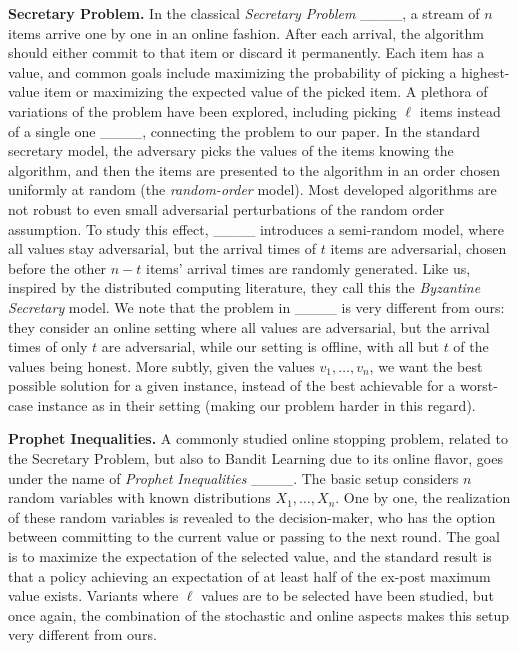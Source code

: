 \noindent \textbf{Secretary Problem.} In the classical \emph{Secretary Problem} ____, a stream of $n$ items arrive one by one in an online fashion. After each arrival, the algorithm should either commit to that item or discard it permanently. Each item has a value, and common goals include maximizing the probability of picking a highest-value item or maximizing the expected value of the picked item. A plethora of variations of the problem have been explored, including picking $\ell$ items instead of a single one ____, connecting the problem to our paper. In the standard secretary model, the adversary picks the values of the items knowing the algorithm, and then the items are presented to the algorithm in an order chosen uniformly at random (the \emph{random-order} model). Most developed algorithms are not robust to even small adversarial perturbations of the random order assumption. To study this effect, ____ introduces a semi-random model, where all values stay adversarial, but the arrival times of $t$ items are adversarial, chosen before the other $n - t$ items' arrival times are randomly generated. Like us, inspired by the distributed computing literature, they call this the \emph{Byzantine Secretary} model. We note that the problem in ____ is very different from ours: they consider an online setting where all values are adversarial, but the arrival times of only $t$ are adversarial, while our setting is offline, with all but $t$ of the values being honest. More subtly, given the values $v_1, \dots, v_n$, we want 
the best possible solution for a given instance, instead of the best achievable for a worst-case instance as in their setting (making our problem harder in this regard).

\noindent \textbf{Prophet Inequalities.} A commonly studied online stopping problem, related to the Secretary Problem, but also to Bandit Learning due to its online flavor, goes under the name of \emph{Prophet Inequalities} ____. The basic setup considers $n$ random variables with known distributions $X_1, \dots, X_n$. One by one, the realization of these random variables is revealed to the decision-maker, who has the option between committing to the current value or passing to the next round. The goal is to maximize the expectation of the selected value, and the standard result is that a policy achieving an expectation of at least half of the ex-post maximum value exists. Variants where $\ell$ values are to be selected have been studied, but once again, the combination of the stochastic and online aspects makes this setup very different from ours.